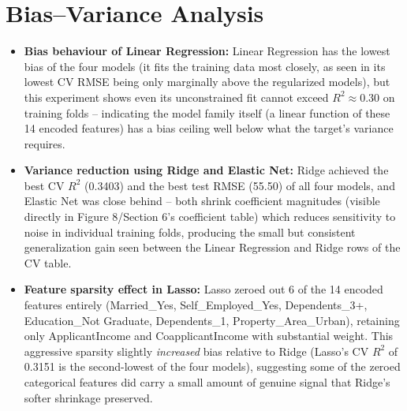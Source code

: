 \documentclass[12pt,a4paper]{article}
\begin{document}
\section{Bias--Variance Analysis}
\begin{itemize}
\item \textbf{Bias behaviour of Linear Regression:} Linear Regression has the lowest bias
of the four models (it fits the training data most closely, as seen in its lowest CV RMSE
being only marginally above the regularized models), but this experiment shows even its
unconstrained fit cannot exceed $R^2 \approx 0.30$ on training folds -- indicating the
model family itself (a linear function of these 14 encoded features) has a bias ceiling well
below what the target's variance requires.
\item \textbf{Variance reduction using Ridge and Elastic Net:} Ridge achieved the best CV
$R^2$ (0.3403) and the best test RMSE (55.50) of all four models, and Elastic Net was close
behind -- both shrink coefficient magnitudes (visible directly in Figure 8/Section 6's
coefficient table) which reduces sensitivity to noise in individual training folds, producing
the small but consistent generalization gain seen between the Linear Regression and Ridge
rows of the CV table.
\item \textbf{Feature sparsity effect in Lasso:} Lasso zeroed out 6 of the 14 encoded
features entirely (Married\_Yes, Self\_Employed\_Yes, Dependents\_3+, Education\_Not
Graduate, Dependents\_1, Property\_Area\_Urban), retaining only ApplicantIncome and
CoapplicantIncome with substantial weight. This aggressive sparsity slightly \emph{increased}
bias relative to Ridge (Lasso's CV $R^2$ of 0.3151 is the second-lowest of the four models),
suggesting some of the zeroed categorical features did carry a small amount of genuine
signal that Ridge's softer shrinkage preserved.
\end{itemize}
\end{document}
